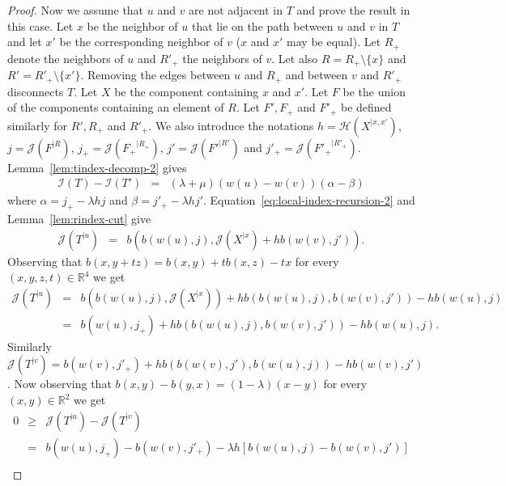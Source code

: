 \documentclass[11 pt]{modarticle}
\newcommand{\cR}{\mathbb{R}}
\newcommand{\wmap}{w}
\newcommand{\rtree}[2]{{#1}^{\lvert #2}}
\newcommand{\bilinear}{b}
\newcommand{\indexsymbol}{\mathcal{I}}
\newcommand{\tindex}[1]{\indexsymbol(#1)}
\newcommand{\rindexsymbol}{\mathcal{J}}
\newcommand{\rindex}[2]{\rindexsymbol(\rtree{#2}{#1})}
\newcommand{\aindexsymbol}{\mathcal{H}}
\newcommand{\aindex}[3]{\aindexsymbol(\rtree{#3}{#1, #2})}
\begin{document}
\begin{proof}
Now we assume that $u$ and $v$ are not adjacent in $T$ and prove the result in this case. Let $x$ be the neighbor of $u$ that lie on the path between $u$ and $v$ in $T$ and let $x'$ be the corresponding neighbor of $v$ ($x$ and $x'$ may be equal). Let $R_+$ denote the neighbors of $u$ and $R'_+$ the neighbors of $v$. Let also $R = R_+ \setminus \{x\}$ and $R'= R'_+ \setminus \{x'\}$. Removing the edges between $u$ and $R_+$ and between $v$ and $R'_+$ disconnects $T$. Let $X$ be the component containing $x$ and $x'$. Let $F$ be the union of the components containing an element of $R$. Let $F', F_+$ and $F'_+$ be defined similarly for $R', R_+$ and $R'_+$. We also introduce the notations $h = \aindex{x}{x'}{X}$, $j = \rindex{R}{F}$, $j_+ = \rindex{R_+}{F_+}$, $j' = \rindex{R'}{F'}$ and $j'_+ = \rindex{R'_+}{F'_+}$. Lemma~\ref{lem:tindex-decomp-2} gives
\begin{eqnarray}
	\tindex{T} - \tindex{T'} & = & (\lambda + \mu)(\wmap(u) - \wmap(v))(\alpha - \beta) \label{eq:compacity-map-proof-eq3}
\end{eqnarray}
where $\alpha = j_+ - \lambda h j$ and $\beta = j'_+ - \lambda h j'$. Equation~\eqref{eq:local-index-recursion-2} and Lemma~\ref{lem:rindex-cut} give
\begin{eqnarray*}
	\rindex{u}{T} & = & \bilinear(\bilinear(\wmap(u),j), \rindex{x}{X} + h \bilinear(\wmap(v),j')).
\end{eqnarray*}
Observing that $\bilinear(x, y + tz) = \bilinear(x,y) + t \bilinear(x,z) - tx$ for every $(x,y,z,t) \in \cR^4$ we get
\begin{eqnarray*}
	\rindex{u}{T} & = & \bilinear\left(\bilinear(\wmap(u),j), \rindex{x}{X}\right) + h \bilinear\left(\bilinear(\wmap(u),j), \bilinear(\wmap(v),j')\right) - h \bilinear(\wmap(u),j) \\
	& = & \bilinear(\wmap(u), j_+) + h \bilinear\left(\bilinear(\wmap(u),j), \bilinear(\wmap(v),j')\right) - h \bilinear(\wmap(u),j).
\end{eqnarray*}
Similarly $\rindex{v}{T} = \bilinear(\wmap(v), j'_+) + h \bilinear\left(\bilinear(\wmap(v),j'), \bilinear(\wmap(u),j)\right) - h \bilinear(\wmap(v),j')$. Now observing that $\bilinear(x, y) - \bilinear(y, x) = (1 - \lambda)(x-y)$ for every $(x, y) \in \cR^2$ we get
\begin{eqnarray}
	0 & \geq & \rindex{u}{T} - \rindex{v}{T} \nonumber \\
	& = & \bilinear(\wmap(u), j_+) - \bilinear(\wmap(v), j'_+) - \lambda h[\bilinear(\wmap(u),j) - \bilinear(\wmap(v),j')] \nonumber \\

\end{eqnarray}
\end{proof}
\end{document}

